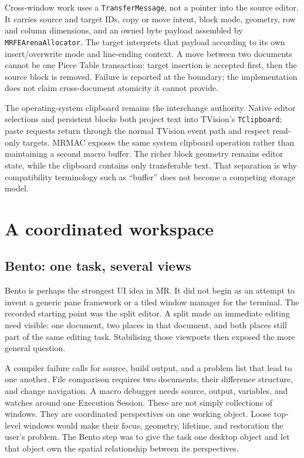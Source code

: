 \documentclass[a4paper,10pt,twoside,openany]{book}
\newcommand{\mr}{\textsc{MR}}
\newcommand{\mrmac}{\textsc{MRMAC}}
\begin{document}
Cross-window work uses a \texttt{TransferMessage}, not a pointer into the
source editor. It carries source and target IDs, copy or move intent, block
mode, geometry, row and column dimensions, and an owned byte payload assembled
by \texttt{MRFEArenaAllocator}. The target interprets that payload according to
its own insert/overwrite mode and line-ending context. A move between two
documents cannot be one Piece Table transaction: target insertion is accepted
first, then the source block is removed. Failure is reported at the boundary;
the implementation does not claim cross-document atomicity it cannot provide.

The operating-system clipboard remains the interchange authority. Native
editor selections and persistent blocks both project text into TVision's
\texttt{TClipboard}; paste requests return through the normal TVision event
path and respect read-only targets. \mrmac{} exposes the same system clipboard
operation rather than maintaining a second macro buffer. The richer block
geometry remains editor state, while the clipboard contains only transferable
text. That separation is why compatibility terminology such as ``buffer'' does
not become a competing storage model.

\part{A coordinated workspace}

\chapter{Bento: one task, several views}

Bento is perhaps the strongest UI idea in \mr{}. It did not begin as an
attempt to invent a generic pane framework or a tiled window manager for the
terminal. The recorded starting point was the split editor. A split made an
immediate editing need visible: one document, two places in that document, and
both places still part of the same editing task. Stabilising those viewports
then exposed the more general question.

A compiler failure calls for source, build output, and a problem list that
lead to one another. File comparison requires two documents, their difference
structure, and change navigation. A macro debugger needs source, output,
variables, and watches around one Execution Session. These are not simply
collections of windows. They are coordinated perspectives on one working
object. Loose top-level windows would make their focus, geometry, lifetime,
and restoration the user's problem. The Bento step was to give the task one
desktop object and let that object own the spatial relationship between its
perspectives.
\end{document}
